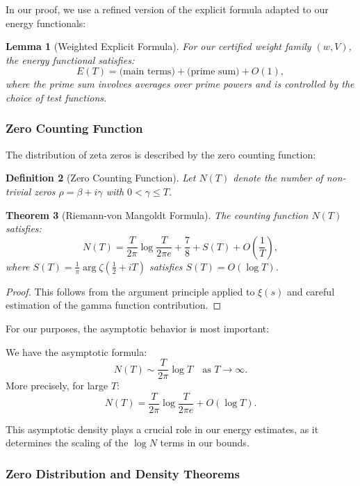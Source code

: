 \documentclass[11pt,hyp,]{nyjm}
\newtheorem{theorem}{Theorem}
\newtheorem{lemma}[theorem]{Lemma}
\newtheorem{definition}[theorem]{Definition}
\begin{document}
In our proof, we use a refined version of the explicit formula adapted to our energy functionals:

\begin{lemma}[Weighted Explicit Formula]\label{lem:weighted-explicit}
For our certified weight family $(w,V)$, the energy functional satisfies:
\[
E(T) = \text{(main terms)} + \text{(prime sum)} + O(1),
\]
where the prime sum involves averages over prime powers and is controlled by the choice of test functions.
\end{lemma}

\subsubsection{Zero Counting Function}

The distribution of zeta zeros is described by the zero counting function:

\begin{definition}[Zero Counting Function]
Let $N(T)$ denote the number of non-trivial zeros $\rho = \beta + i\gamma$ with $0 < \gamma \leq T$.
\end{definition}

\begin{theorem}[Riemann-von Mangoldt Formula]\label{thm:zero-counting}
The counting function $N(T)$ satisfies:
\[
N(T) = \frac{T}{2\pi} \log \frac{T}{2\pi e} + \frac{7}{8} + S(T) + O\left(\frac{1}{T}\right),
\]
where $S(T) = \frac{1}{\pi} \arg \zeta(\tfrac12 + iT)$ satisfies $S(T) = O(\log T)$.
\end{theorem}

\begin{proof}
This follows from the argument principle applied to $\xi(s)$ and careful estimation of the gamma function contribution.
\end{proof}

For our purposes, the asymptotic behavior is most important:

\begin{corollary}\label{cor:zero-density}
We have the asymptotic formula:
\[
N(T) \sim \frac{T}{2\pi} \log T \quad \text{as } T \to \infty.
\]
More precisely, for large $T$:
\[
N(T) = \frac{T}{2\pi} \log \frac{T}{2\pi e} + O(\log T).
\]
\end{corollary}

This asymptotic density plays a crucial role in our energy estimates, as it determines the scaling of the $\log N$ terms in our bounds.

\subsubsection{Zero Distribution and Density Theorems}
\end{document}
